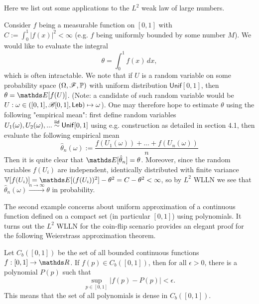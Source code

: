 Here we list out some applications to the $L^2$ weak law of large numbers.
\begin{example} \label{eg:Monte_Carlo_L2}
Consider $f$ being a measurable function on $[0,1]$ with \\ $C := \int_0^1 |f(x)|^2 < \infty$ (e.g. $f$ being uniformly bounded by some number $M$). We would like to evaluate the integral
\begin{equation*}
    \theta = \int_0^1 f(x) \, dx,
\end{equation*}
which is often intractable. We note that if $U$ is a random variable on some probability space $(\Omega,\mathcal{F},\mathbb{P})$ with uniform  distribution $\mathsf{Unif}[0,1]$, then $\theta = \E[f(U)]$. (Note: a candidate of such random variable would be $U: \omega \in ([0,1],\mathcal{B}[0,1],\mathsf{Leb}) \mapsto \omega$). One may therefore hope to estimate $\theta$ using the following "empirical mean": first define random variables $U_1(\omega), U_2(\omega), ... \overset{\mathsf{iid}}\sim \mathsf{Unif}[0,1]$ using e.g. construction as detailed in section 4.1, then evaluate the following empirical mean
\begin{equation}
\hat{\theta}_n(\omega) := \frac{f(U_1(\omega))+...+f(U_n(\omega))}{n}
\end{equation}
Then it is quite clear that $\E[\hat{\theta}_n] = \theta$. Moreover, since the random variables $f(U_i)$ are independent, identically distributed with finite variance $\V[f(U_i)] = \E[(f(U_i))^2] - \theta^2 = C-\theta^2 < \infty$, so by $L^2$ WLLN we see that $\hat{\theta}_n(\omega) \overset{n\to\infty}\to \theta$ in probability.
\end{example}

The second example concerns about uniform approximation of a continuous function defined on a compact set (in particular $[0,1]$) using polynomials. It turns out the $L^2$ WLLN for the coin-flip scenario provides an elegant proof for the following Weierstrass approximation theorem.

\begin{theorem}
Let $C_b([0,1])$ be the set of all bounded continuous functions $f:[0,1]\to \R$. If $f(p) \in C_b([0,1])$, then for all $\epsilon > 0$, there is a polynomial $P(p)$ such that
\begin{equation}
    \sup_{p \in [0,1]} |f(p) - P(p)| < \epsilon.
\end{equation}
This means that the set of all polynomials is dense in $C_b([0,1])$.
\end{theorem}

